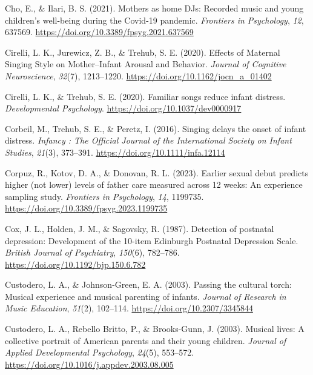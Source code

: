 \documentclass[
]{article}
\newlength{\cslhangindent}
\newenvironment{CSLReferences}[2] %
 {\begin{list}{}{%
  \setlength{\itemindent}{0pt}
  \setlength{\leftmargin}{0pt}
  \setlength{\parsep}{0pt}
  \ifodd #1
   \setlength{\leftmargin}{\cslhangindent}
   \setlength{\itemindent}{-1\cslhangindent}
  \fi
  \setlength{\itemsep}{#2\baselineskip}}}
 {\end{list}}
\begin{document}
\begin{CSLReferences}{1}{0}
Cho, E., \& Ilari, B. S. (2021). Mothers as home {DJs}: {Recorded} music
and young children's well-being during the {Covid-19} pandemic.
\emph{Frontiers in Psychology}, \emph{12}, 637569.
\url{https://doi.org/10.3389/fpsyg.2021.637569}

Cirelli, L. K., Jurewicz, Z. B., \& Trehub, S. E. (2020). Effects of
{Maternal Singing Style} on {Mother}--{Infant Arousal} and {Behavior}.
\emph{Journal of Cognitive Neuroscience}, \emph{32}(7), 1213--1220.
\url{https://doi.org/10.1162/jocn_a_01402}

Cirelli, L. K., \& Trehub, S. E. (2020). Familiar songs reduce infant
distress. \emph{Developmental Psychology}.
\url{https://doi.org/10.1037/dev0000917}

Corbeil, M., Trehub, S. E., \& Peretz, I. (2016). Singing delays the
onset of infant distress. \emph{Infancy : The Official Journal of the
International Society on Infant Studies}, \emph{21}(3), 373--391.
\url{https://doi.org/10.1111/infa.12114}

Corpuz, R., Kotov, D. A., \& Donovan, R. L. (2023). Earlier sexual debut
predicts higher (not lower) levels of father care measured across 12
weeks: {An} experience sampling study. \emph{Frontiers in Psychology},
\emph{14}, 1199735. \url{https://doi.org/10.3389/fpsyg.2023.1199735}

Cox, J. L., Holden, J. M., \& Sagovsky, R. (1987). Detection of
postnatal depression: {Development} of the 10-item {Edinburgh Postnatal
Depression Scale}. \emph{British Journal of Psychiatry}, \emph{150}(6),
782--786. \url{https://doi.org/10.1192/bjp.150.6.782}

Custodero, L. A., \& Johnson-Green, E. A. (2003). Passing the cultural
torch: {Musical} experience and musical parenting of infants.
\emph{Journal of Research in Music Education}, \emph{51}(2), 102--114.
\url{https://doi.org/10.2307/3345844}

Custodero, L. A., Rebello Britto, P., \& Brooks-Gunn, J. (2003). Musical
lives: {A} collective portrait of {American} parents and their young
children. \emph{Journal of Applied Developmental Psychology},
\emph{24}(5), 553--572.
\url{https://doi.org/10.1016/j.appdev.2003.08.005}


\end{CSLReferences}
\end{document}
